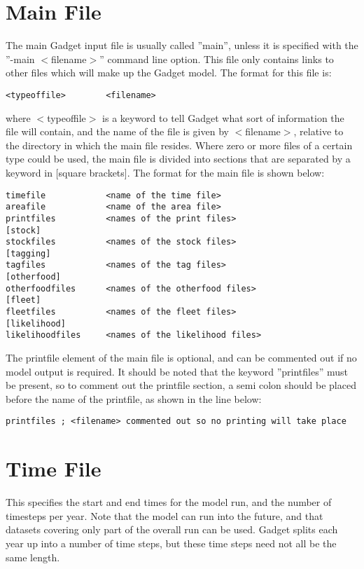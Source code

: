 \documentclass[10pt,twoside]{book}
\begin{document}
\section{Main File}\label{sec:mainfile}
The main Gadget input file is usually called ''main'', unless it is specified with the ''-main $<$filename$>$'' command line option.  This file only contains links to other files which will make up the Gadget model.  The format for this file is:

{\small\begin{verbatim}
<typeoffile>        <filename>
\end{verbatim}}

where $<$typeoffile$>$ is a keyword to tell Gadget what sort of information the file will contain, and the name of the file is given by $<$filename$>$, relative to the directory in which the main file resides.  Where zero or more files of a certain type could be used, the main file is divided into sections that are separated by a keyword in [square brackets].  The format for the main file is shown below:

{\small\begin{verbatim}
timefile            <name of the time file>
areafile            <name of the area file>
printfiles          <names of the print files>
[stock]
stockfiles          <names of the stock files>
[tagging]
tagfiles            <names of the tag files>
[otherfood]
otherfoodfiles      <names of the otherfood files>
[fleet]
fleetfiles          <names of the fleet files>
[likelihood]
likelihoodfiles     <names of the likelihood files>
\end{verbatim}}

The printfile element of the main file is optional, and can be commented out if no model output is required.  It should be noted that the keyword ''printfiles'' must be present, so to comment out the printfile section, a semi colon should be placed before the name of the printfile, as shown in the line below:

{\small\begin{verbatim}
printfiles ; <filename> commented out so no printing will take place
\end{verbatim}}

\section{Time File}\label{sec:timefile}
This specifies the start and end times for the model run, and the number of timesteps per year. Note that the model can run into the future, and that datasets covering only part of the overall run can be used.  Gadget splits each year up into a number of time steps, but these time steps need not all be the same length.
\end{document}
